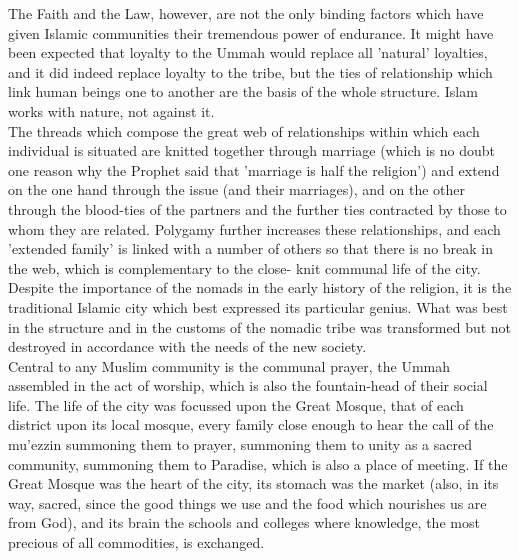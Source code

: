 \documentclass[10pt, twoside]{book}
\begin{document}
The Faith and the Law, however, are not the only binding factors which have given Islamic communities 
their tremendous power of endurance. It might have been expected that loyalty to the Ummah would 
replace all 'natural' loyalties, and it did indeed replace loyalty to the tribe, but the ties of 
relationship which link human beings one to another are the basis of the whole structure. Islam works 
with nature, not against it. \\

The threads which compose the great web of relationships within which each individual is situated are 
knitted together through marriage (which is no doubt one reason why the Prophet said that 'marriage 
is half the religion') and extend on the one hand through the issue (and their marriages), and on the 
other through the blood\hyp{}ties of the partners and the further ties contracted by those to whom they 
are related. Polygamy further increases these relationships, and each 'extended family' is linked 
with a number of others so that there is no break in the web, which is complementary to the close\hyp{}
knit communal life of the city. \\

Despite the importance of the nomads in the early history of the religion, it is the traditional 
Islamic city which best expressed its particular genius. What was best in the structure and in the 
customs of the nomadic tribe was transformed but not destroyed in accordance with the needs of the 
new society. \\

Central to any Muslim community is the communal prayer, the Ummah assembled in the act of worship, 
which is also the fountain\hyp{}head of their social life. The life of the city was focussed upon the Great 
Mosque, that of each district upon its local mosque, every family close enough to hear the call of 
the mu'ezzin summoning them to prayer, summoning them to unity as a sacred community, summoning them 
to Paradise, which is also a place of meeting. If the Great Mosque was the heart of the city, its 
stomach was the market (also, in its way, sacred, since the good things we use and the food which 
nourishes us are from God), and its brain the schools and colleges where knowledge, the most precious 
of all commodities, is exchanged. \\
\end{document}
